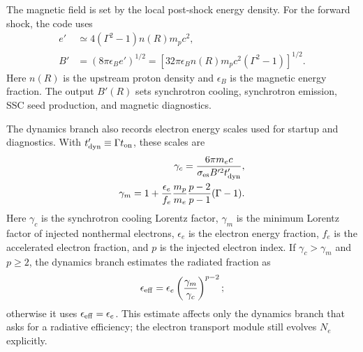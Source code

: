 \documentclass[twocolumn]{aastex702}
\begin{document}
The magnetic field is set by the local post-shock energy density.  For the
forward shock, the code uses
\begin{equation}
\begin{aligned}
e' &\simeq4(\Gamma^2-1)n(R)m_pc^2,\\
B' &=\left(8\pi\epsilon_B e'\right)^{1/2}
=\left[32\pi\epsilon_B n(R)m_pc^2(\Gamma^2-1)\right]^{1/2}.
\end{aligned}
\end{equation}
Here \(n(R)\) is the upstream proton density and \(\epsilon_B\) is the magnetic
energy fraction.  The output \(B'(R)\) sets synchrotron cooling, synchrotron
emission, SSC seed production, and magnetic diagnostics.

The dynamics branch also records electron energy scales used for startup and
diagnostics.  With \(t'_{\rm dyn}\equiv\Gamma t_{\rm on}\), these scales are
\begin{equation}
\begin{aligned}
\gamma_c=
\frac{6\pi m_ec}{\sigma_{\rm es} B'^2t'_{\rm dyn}},
\\
\gamma_m=
1+\frac{\epsilon_e}{f_e}
\frac{m_p}{m_e}
\frac{p-2}{p-1}
(\Gamma-1).
\end{aligned}
\end{equation}
Here \(\gamma_c\) is the synchrotron cooling Lorentz factor, \(\gamma_m\) is the
minimum Lorentz factor of injected nonthermal electrons, \(\epsilon_e\) is the
electron energy fraction, \(f_e\) is the accelerated electron fraction, and \(p\)
is the injected electron index.  If \(\gamma_c>\gamma_m\) and \(p\ge2\), the
dynamics branch estimates the radiated fraction as
\begin{equation}
\epsilon_{\rm eff}=\epsilon_e\left(\frac{\gamma_m}{\gamma_c}\right)^{p-2};
\end{equation}
otherwise it uses \(\epsilon_{\rm eff}=\epsilon_e\).  This estimate affects only
the dynamics branch that asks for a radiative efficiency; the electron transport
module still evolves \(N_e\) explicitly.
\end{document}

